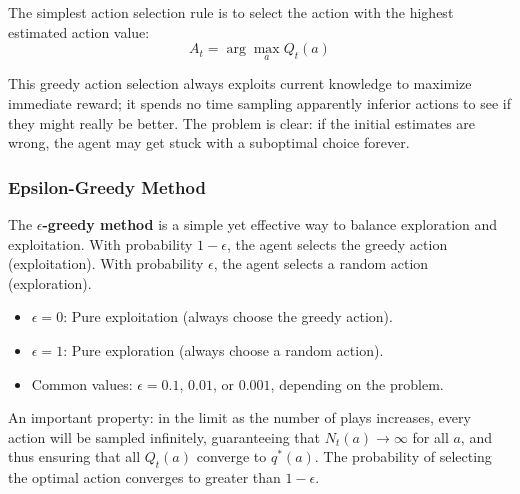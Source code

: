\documentclass[11pt,a4paper]{article}
\begin{document}
The simplest action selection rule is to select the action with the highest estimated action value:
\[
A_t = \arg\max_a Q_t(a)
\]

This greedy action selection always exploits current knowledge to maximize immediate reward; it spends no time sampling apparently inferior actions to see if they might really be better. The problem is clear: if the initial estimates are wrong, the agent may get stuck with a suboptimal choice forever.

\subsubsection{Epsilon-Greedy Method}

The \textbf{$\epsilon$-greedy method} is a simple yet effective way to balance exploration and exploitation. With probability $1 - \epsilon$, the agent selects the greedy action (exploitation). With probability $\epsilon$, the agent selects a random action (exploration).

\begin{itemize}
    \item $\epsilon = 0$: Pure exploitation (always choose the greedy action).
    \item $\epsilon = 1$: Pure exploration (always choose a random action).
    \item Common values: $\epsilon = 0.1$, $0.01$, or $0.001$, depending on the problem.
\end{itemize}

An important property: in the limit as the number of plays increases, every action will be sampled infinitely, guaranteeing that $N_t(a) \to \infty$ for all $a$, and thus ensuring that all $Q_t(a)$ converge to $q^*(a)$. The probability of selecting the optimal action converges to greater than $1 - \epsilon$.
\end{document}
